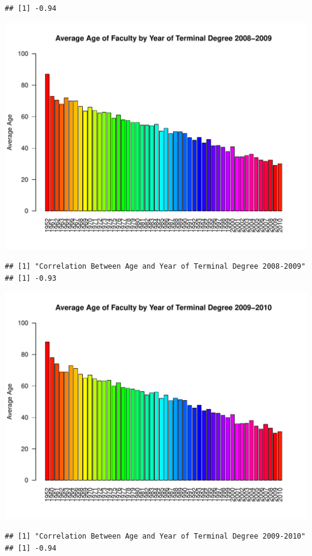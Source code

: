 \documentclass[12pt,a4paper]{article}\usepackage[]{graphicx}\usepackage[]{color}
\makeatletter
\def\maxwidth{ %
  \ifdim\Gin@nat@width>\linewidth
    \linewidth
  \else
    \Gin@nat@width
  \fi
}
\newenvironment{kframe}{%
 \def\at@end@of@kframe{}%
 \ifinner\ifhmode%
  \def\at@end@of@kframe{\end{minipage}}%
  \begin{minipage}{\columnwidth}%
 \fi\fi%
 \def\FrameCommand##1{\hskip\@totalleftmargin \hskip-\fboxsep
 \colorbox{shadecolor}{##1}\hskip-\fboxsep
     \hskip-\linewidth \hskip-\@totalleftmargin \hskip\columnwidth}%
 \MakeFramed {\advance\hsize-\width
   \@totalleftmargin\z@ \linewidth\hsize
   \@setminipage}}%
 {\par\unskip\endMakeFramed%
 \at@end@of@kframe}
\newenvironment{knitrout}{}{} %
\theoremstyle{definition}
\makeatother
\begin{document}
\begin{knitrout}
\begin{kframe}
\begin{verbatim}
## [1] -0.94
\end{verbatim}
\end{kframe}
\includegraphics[width=\maxwidth]{figure/unnamed-chunk-12-5} 
\begin{kframe}\begin{verbatim}
## [1] "Correlation Between Age and Year of Terminal Degree 2008-2009"
## [1] -0.93
\end{verbatim}
\end{kframe}
\includegraphics[width=\maxwidth]{figure/unnamed-chunk-12-6} 
\begin{kframe}\begin{verbatim}
## [1] "Correlation Between Age and Year of Terminal Degree 2009-2010"
## [1] -0.94

\end{verbatim}
\end{kframe}
\end{knitrout}
\end{document}
